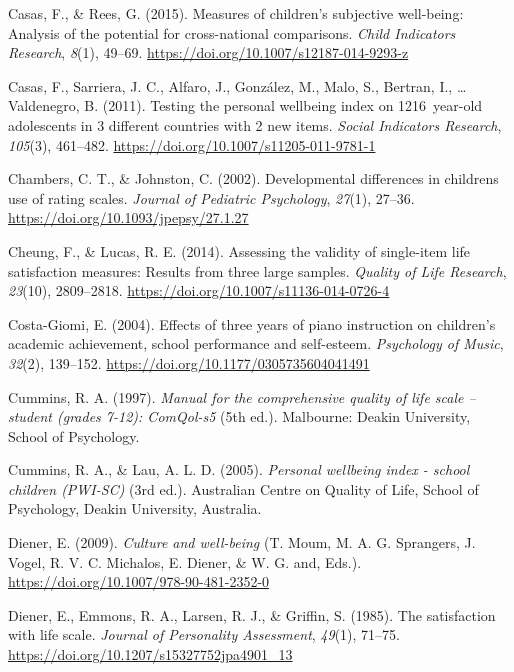\documentclass[a4, 12pt]{article}
\begin{document}
\leavevmode\hypertarget{ref-Casas2015}{}%
Casas, F., \& Rees, G. (2015). Measures of children's subjective well-being: Analysis of the potential for cross-national comparisons. \emph{Child Indicators Research}, \emph{8}(1), 49--69. \url{https://doi.org/10.1007/s12187-014-9293-z}

\leavevmode\hypertarget{ref-Casas2011}{}%
Casas, F., Sarriera, J. C., Alfaro, J., González, M., Malo, S., Bertran, I., \ldots{} Valdenegro, B. (2011). Testing the personal wellbeing index on 1216~year-old adolescents in 3 different countries with 2 new items. \emph{Social Indicators Research}, \emph{105}(3), 461--482. \url{https://doi.org/10.1007/s11205-011-9781-1}

\leavevmode\hypertarget{ref-Johnston2002}{}%
Chambers, C. T., \& Johnston, C. (2002). Developmental differences in childrens use of rating scales. \emph{Journal of Pediatric Psychology}, \emph{27}(1), 27--36. \url{https://doi.org/10.1093/jpepsy/27.1.27}

\leavevmode\hypertarget{ref-Cheung2014}{}%
Cheung, F., \& Lucas, R. E. (2014). Assessing the validity of single-item life satisfaction measures: Results from three large samples. \emph{Quality of Life Research}, \emph{23}(10), 2809--2818. \url{https://doi.org/10.1007/s11136-014-0726-4}

\leavevmode\hypertarget{ref-CostaGiomi2004}{}%
Costa-Giomi, E. (2004). Effects of three years of piano instruction on children's academic achievement, school performance and self-esteem. \emph{Psychology of Music}, \emph{32}(2), 139--152. \url{https://doi.org/10.1177/0305735604041491}

\leavevmode\hypertarget{ref-Cummins1997}{}%
Cummins, R. A. (1997). \emph{Manual for the comprehensive quality of life scale -- student (grades 7-12): ComQol-s5} (5th ed.). Malbourne: Deakin University, School of Psychology.

\leavevmode\hypertarget{ref-Cummins2005}{}%
Cummins, R. A., \& Lau, A. L. D. (2005). \emph{Personal wellbeing index - school children (PWI-SC)} (3rd ed.). Australian Centre on Quality of Life, School of Psychology, Deakin University, Australia.

\leavevmode\hypertarget{ref-Diener2009}{}%
Diener, E. (2009). \emph{Culture and well-being} (T. Moum, M. A. G. Sprangers, J. Vogel, R. V. C. Michalos, E. Diener, \& W. G. and, Eds.). \url{https://doi.org/10.1007/978-90-481-2352-0}

\leavevmode\hypertarget{ref-Diener1985}{}%
Diener, E., Emmons, R. A., Larsen, R. J., \& Griffin, S. (1985). The satisfaction with life scale. \emph{Journal of Personality Assessment}, \emph{49}(1), 71--75. \url{https://doi.org/10.1207/s15327752jpa4901_13}
\end{document}

